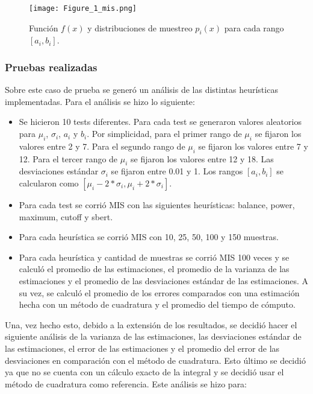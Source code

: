 \documentclass{article}
\begin{document}
\begin{figure}[H]
\texttt{[image: Figure\_1\_mis.png]}
\caption{Función \( f(x) \) y distribuciones de muestreo \( p_{i}(x) \) para cada rango \( [a_{i}, b_{i}] \).}
\label{fig:mis1}
\end{figure}

\subsubsection{Pruebas realizadas}

Sobre este caso de prueba se generó un análisis de las distintas heurísticas implementadas.
Para el análisis se hizo lo siguiente:
\begin{itemize}
    \item Se hicieron 10 tests diferentes. Para cada test se generaron valores aleatorios para \( \mu_{i} \), \( \sigma_{i} \), \( a_{i} \) y \( b_{i} \).
          Por simplicidad, para el primer rango de  \( \mu_{i} \) se fijaron los valores entre 2 y 7.
          Para el segundo rango de \( \mu_{i} \) se fijaron los valores entre 7 y 12.
          Para el tercer rango de \( \mu_{i} \) se fijaron los valores entre 12 y 18.
          Las desviaciones estándar \( \sigma_{i} \) se fijaron entre 0.01 y 1.
          Los rangos \( [a_{i}, b_{i}] \) se calcularon como \( [ \mu_{i} - 2 * \sigma_{i}, \mu_{i} + 2 * \sigma_{i} ] \).
    \item Para cada test se corrió MIS con las siguientes heurísticas: balance, power, maximum, cutoff y sbert.
    \item Para cada heurística se corrió MIS con 10, 25, 50, 100 y 150 muestras.
    \item Para cada heurística y cantidad de muestras se corrió MIS 100 veces y se calculó el promedio de las estimaciones,
          el promedio de la varianza de las estimaciones y el promedio de las desviaciones estándar de las estimaciones.
          A su vez, se calculó el promedio de los errores comparados con una estimación hecha con un método de cuadratura y el promedio del tiempo de cómputo.
\end{itemize}

Una, vez hecho esto, debido a la extensión de los resultados, se decidió hacer el siguiente análisis de la varianza de las estimaciones, las desviaciones estándar de las estimaciones, el error de las estimaciones y el promedio del error de las desviaciones en comparación con el método de cuadratura.
Esto último se decidió ya que no se cuenta con un cálculo exacto de la integral y se decidió usar el método de cuadratura como referencia.
Este análisis se hizo para:
\end{document}
